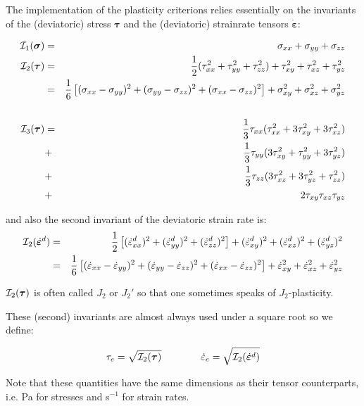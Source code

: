 The implementation of the plasticity criterions relies essentially 
on the invariants of the (deviatoric) stress ${\bm \tau}$ 
and the (deviatoric) strainrate tensors $\dot{\bm \varepsilon}$:

\begin{eqnarray}
{\cal I}_1({\bm \sigma}) &=& \sigma_{xx}+\sigma_{yy}+\sigma_{zz}\\
{\cal I}_2({\bm \tau})   
&=&\frac{1}{2}(\tau_{xx}^2 + \tau_{yy}^2 + \tau_{zz}^2 ) + \tau_{xy}^2 + \tau_{xz}^2 + \tau_{yz}^2  \\
&=&\frac{1}{6}\left[(\sigma_{xx}-\sigma_{yy})^2 + (\sigma_{yy}-\sigma_{zz})^2 + (\sigma_{xx}-\sigma_{zz})^2 \right]  + \sigma_{xy}^2 + \sigma_{xz}^2 + \sigma_{yz}^2  \\
\nonumber\\
{\cal I}_3({\bm \tau}) 
&=& \frac{1}{3} \tau_{xx} (  \tau_{xx}^2 + 3 \tau_{xy}^2 + 3 \tau_{xz}^2  )     \nonumber\\
&+& \frac{1}{3} \tau_{yy} (3 \tau_{xy}^2 +   \tau_{yy}^2 + 3 \tau_{yz}^2  )     \nonumber\\
&+& \frac{1}{3} \tau_{zz} (3 \tau_{xz}^2 + 3 \tau_{yz}^2 +   \tau_{zz}^2)       \nonumber\\
&+& 2 \tau_{xy} \tau_{xz} \tau_{yz}  
\end{eqnarray}

and also the second invariant of the deviatoric strain rate is:
\begin{eqnarray}
{\cal I}_2(\dot{\bm{\varepsilon}}^d)
&=& \frac{1}{2} \left[ (\dot{\varepsilon}_{xx}^d)^2 + (\dot{\varepsilon}_{yy}^d)^2 + (\dot{\varepsilon}_{zz}^d)^2   \right] 
+ (\dot{\varepsilon}_{xy}^d)^2  
+ (\dot{\varepsilon}_{xz}^d)^2  
+ (\dot{\varepsilon}_{yz}^d)^2  \nonumber\\
&=& \frac{1}{6} \left[ (\dot{\varepsilon}_{xx}-\dot{\varepsilon}_{yy})^2 
+ (\dot{\varepsilon}_{yy}-\dot{\varepsilon}_{zz})^2 
+ (\dot{\varepsilon}_{xx}-\dot{\varepsilon}_{zz})^2 \right] 
+ \dot{\varepsilon}_{xy}^2 + \dot{\varepsilon}_{xz}^2 + \dot{\varepsilon}_{yz}^2 \label{eq:I2epsd} 
\end{eqnarray}

\begin{remark}
${\cal I}_2({\bm \tau})$ is often called $J_2$ or $J_2'$ so that one sometimes speaks of $J_2$-plasticity.
\end{remark}

These (second) invariants are almost always used under a square root so we define:
\begin{mdframed}[backgroundcolor=blue!5]
\begin{equation}
\tau_{e}=\sqrt{{\cal I}_2({\bm \tau})}
\quad\quad
\quad\quad
\dot{\varepsilon}_{e}=\sqrt{{\cal I}_2(\dot{\bm \varepsilon}^d)}
\label{eq:tauepse}
\end{equation}
\end{mdframed}
Note that these quantities have the same dimensions as their tensor counterparts, i.e. Pa for stresses and s$^{-1}$ for strain rates.

